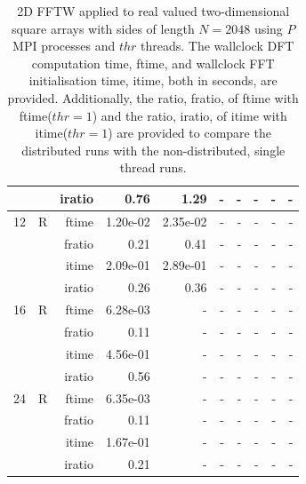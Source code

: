 \documentclass[a4paper]{article}
\begin{document}
\begin{table}[htbp]
\begin{center}
\begin{small}
\begin{tabular}{|r|r|r|r|r|r|r|r|r|r|}
          &      & iratio & 0.76 & 1.29 &     -     &     -     &     -     &     -     &     -     \\ \hline 
     12 & R & ftime & 1.20e-02 & 2.35e-02 &     -     &     -     &     -     &     -     &     -     \\   
          &      & fratio & 0.21 & 0.41 &     -     &     -     &     -     &     -     &     -     \\   
          &      & itime & 2.09e-01 & 2.89e-01 &     -     &     -     &     -     &     -     &     -     \\   
          &      & iratio & 0.26 & 0.36 &     -     &     -     &     -     &     -     &     -     \\ \hline 
     16 & R & ftime & 6.28e-03 &     -     &     -     &     -     &     -     &     -     &     -     \\   
          &      & fratio & 0.11 &     -     &     -     &     -     &     -     &     -     &     -     \\   
          &      & itime & 4.56e-01 &     -     &     -     &     -     &     -     &     -     &     -     \\   
          &      & iratio & 0.56 &     -     &     -     &     -     &     -     &     -     &     -     \\ \hline 
     24 & R & ftime & 6.35e-03 &     -     &     -     &     -     &     -     &     -     &     -     \\   
          &      & fratio & 0.11 &     -     &     -     &     -     &     -     &     -     &     -     \\   
          &      & itime & 1.67e-01 &     -     &     -     &     -     &     -     &     -     &     -     \\   
          &      & iratio & 0.21 &     -     &     -     &     -     &     -     &     -     &     -     \\ \hline 
\end{tabular}
\caption{2D FFTW applied to real valued two-dimensional square arrays with sides of length $N=2048$ using $P$ MPI processes and $thr$ threads. The wallclock DFT computation time, ftime, and wallclock FFT initialisation time, itime, both in seconds, are provided. Additionally, the ratio, fratio, of ftime  with ftime($thr=1$) and the ratio, iratio, of itime  with itime($thr=1$) are provided to compare the distributed runs with the non-distributed, single thread runs.  }\label{TblFFTW2d2048}
\end{small}
\end{center}
\end{table}
\end{document}
